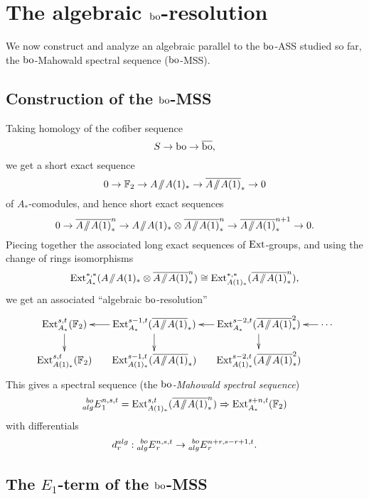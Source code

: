 
\section{The algebraic $\mathrm{bo}$-resolution}\label{sec:alg}

We now construct and analyze an algebraic parallel to the $\mathrm{bo}$-ASS studied so far, the $\mathrm{bo}$-Mahowald spectral sequence ($\mathrm{bo}$-MSS).

\subsection*{Construction of the $\mathrm{bo}$-MSS}

Taking homology of the cofiber sequence
$$ S \rightarrow \mathrm{bo} \rightarrow \overline{\mathrm{bo}}, $$
we get a short exact sequence
$$ 0  \rightarrow \mathbb{F}_2 \rightarrow A \! \sslash \! A(1)_*  \rightarrow \overline{A \! \sslash \! A(1)}_* \rightarrow 0 $$
of $A_*$-comodules, and hence short exact sequences 
$$ 0 \rightarrow \br{A \mmod A(1)}^n_* \rightarrow A \mmod A(1)_* \otimes \br{A \mmod A(1)}^n_*\rightarrow \br{A \mmod A(1)}^{n+1}_*   \rightarrow 0. $$
Piecing together the associated long exact sequences of $\operatorname{Ext}$-groups, and using the change of rings isomorphisms
$$ \operatorname{Ext}^{*,*}_{A_*}(A \! \sslash \! A(1)_* \otimes \overline{A \! \sslash \! A(1)}^n_*) \cong \operatorname{Ext}^{*,*}_{A(1)_*}(\overline{A \! \sslash \! A(1)}^n_*),  $$
we get an associated ``algebraic $\mathrm{bo}$-resolution''
$$
\xymatrix@C-1em@R-1em{
\Ext_{A_*}^{s,t}(\FF_2) \ar[d] 
& \Ext^{s-1,t}_{A_*}(\br{A \mmod A(1)}_*) \ar[l] \ar[d]
& \Ext^{s-2,t}_{A_*}(\br{A \mmod A(1)}^2_*) \ar[l] \ar[d] 
& \cdots \ar[l]
\\
\Ext^{s,t}_{A(1)_*}(\FF_2)
& \Ext^{s-1,t}_{A(1)_*}(\br{A \mmod A(1)}_*)
& \Ext^{s-2,t}_{A(1)_*}(\br{A \mmod A(1) }^2_*)
}
$$
This gives a spectral sequence (the \emph{$\mathrm{bo}$-Mahowald spectral sequence})
$$ \prescript{bo}{alg}{E}_1^{n,s,t} = \operatorname{Ext}^{s,t}_{A(1)_*}(\overline{A\! \sslash \! A(1)}^{n}_*) \Rightarrow \operatorname{Ext}^{s+n,t}_{A_*}(\mathbb{F}_2) $$
with differentials
$$ d^{alg}_r: \prescript{bo}{alg}{E}^{n,s,t}_{r} \rightarrow \prescript{bo}{alg}{E}^{n+r,s-r+1,t}_{{r}}. $$

\subsection*{The $E_1$-term of the $\mathrm{bo}$-MSS}

